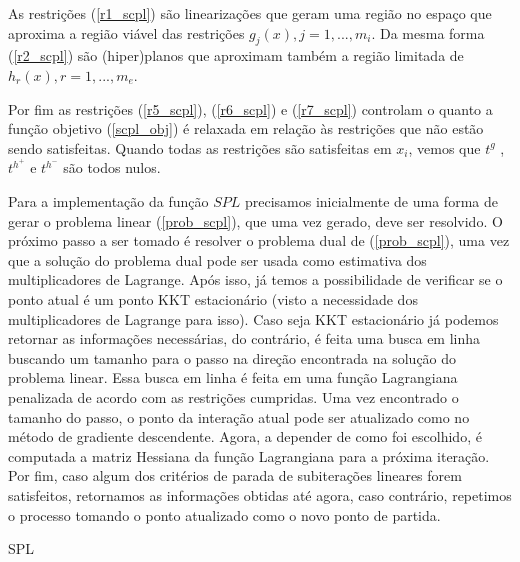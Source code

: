As restrições (\ref{r1_scpl}) são linearizações que geram uma região no espaço que aproxima a região viável
das restrições \( g_j(x), j=1, ..., m_i \). Da mesma forma (\ref{r2_scpl}) são (hiper)planos que aproximam
também a região limitada de \( h_r(x), r=1, ..., m_e \).

Por fim as restrições (\ref{r5_scpl}), (\ref{r6_scpl}) e (\ref{r7_scpl}) controlam o quanto a função objetivo
(\ref{scpl_obj}) é relaxada em relação às restrições que não estão sendo satisfeitas. Quando todas as restrições
são satisfeitas em \(x_i\), vemos que \( t^g \) ,\(t^{h^+}\) e \(t^{h^-} \) são todos nulos.


Para a implementação da função \(SPL\) precisamos inicialmente de uma forma de gerar o problema linear
(\ref{prob_scpl}), que uma vez gerado, deve ser resolvido. O próximo passo a ser tomado é resolver
o problema dual de (\ref{prob_scpl}), uma vez que a solução do problema dual pode ser usada como estimativa
dos multiplicadores de Lagrange. Após isso, já temos a possibilidade de verificar se o ponto atual é um
ponto KKT estacionário (visto a necessidade dos multiplicadores de Lagrange para isso). Caso seja KKT
estacionário já podemos retornar as informações necessárias, do contrário, é feita uma busca em linha
buscando um tamanho para o passo na direção encontrada na solução do problema linear. Essa busca em
linha é feita em uma função Lagrangiana penalizada de acordo com as restrições cumpridas. Uma vez
encontrado o tamanho do passo, o ponto da interação atual pode ser atualizado como no método de gradiente
descendente. Agora, a depender de como foi escolhido, é computada a matriz Hessiana da função Lagrangiana
para a próxima iteração. Por fim, caso algum dos critérios de parada de subiterações lineares forem
satisfeitos, retornamos as informações obtidas até agora, caso contrário, repetimos o processo tomando
o ponto atualizado como o novo ponto de partida.


\vspace{15pt}
\begin{algorithm}[H]
  \SetAlgoLined
  \caption{SPL}
\end{algorithm}
\vspace{15pt}


